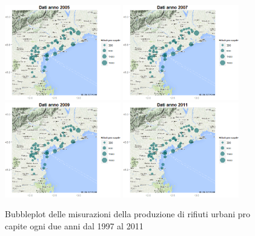 \documentclass[a4paper,11pt,twoside,openright]{book}							%
\begin{document}
\begin{figure}[H]
	\includegraphics[trim=0cm 0cm 0cm 0cm,clip=true,width=0.45\textwidth]{Immagini/venezia_dati/Dati2005.png}
	\includegraphics[trim=0cm 0cm 0cm 0cm,clip=true,width=0.45\textwidth]{Immagini/venezia_dati/Dati2007.png}
	\includegraphics[trim=0cm 0cm 0cm 0cm,clip=true,width=0.45\textwidth]{Immagini/venezia_dati/Dati2009.png}
	\includegraphics[trim=0cm 0cm 0cm 0cm,clip=true,width=0.45\textwidth]{Immagini/venezia_dati/Dati2011.png}
	\caption{Bubbleplot delle misurazioni della produzione di rifiuti urbani pro capite ogni due anni dal 1997 al 2011}
	\label{fig:Ven_bubbledati}
\end{figure}
\end{document}
